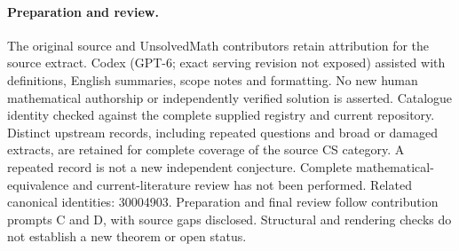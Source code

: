 \documentclass[11pt]{article}
\begin{document}
\paragraph{Preparation and review.}
The original source and UnsolvedMath contributors retain attribution for the source extract. Codex (GPT-6; exact serving revision not exposed) assisted with definitions, English summaries, scope notes and formatting. No new human mathematical authorship or independently verified solution is asserted. Catalogue identity checked against the complete supplied registry and current repository. Distinct upstream records, including repeated questions and broad or damaged extracts, are retained for complete coverage of the source CS category. A repeated record is not a new independent conjecture. Complete mathematical-equivalence and current-literature review has not been performed. Related canonical identities: 30004903. Preparation and final review follow contribution prompts C and D, with source gaps disclosed. Structural and rendering checks do not establish a new theorem or open status.
\label{end:statement}
\end{document}
